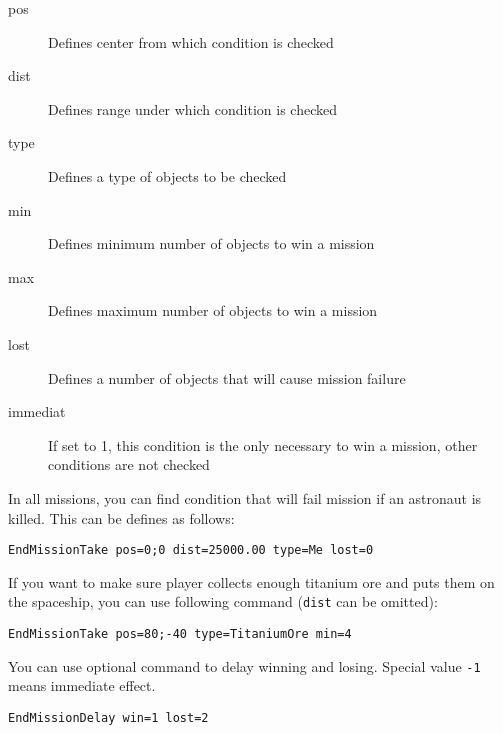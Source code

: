 \begin{description}
    \item[pos] Defines center from which condition is checked
    \item[dist] Defines range under which condition is checked
    \item[type] Defines a type of objects to be checked
    \item[min] Defines minimum number of objects to win a mission
    \item[max] Defines maximum number of objects to win a mission
    \item[lost] Defines a number of objects that will cause mission failure
    \item[immediat] If set to 1, this condition is the only necessary to win a mission, other conditions are not checked
\end{description}

In all missions, you can find condition that will fail mission if an astronaut is killed. This can be defines as follows:

\begin{verbatim}
EndMissionTake pos=0;0 dist=25000.00 type=Me lost=0
\end{verbatim}

If you want to make sure player collects enough titanium ore and puts them on the spaceship, you can use following command (\texttt{dist} can be omitted):

\begin{verbatim}
EndMissionTake pos=80;-40 type=TitaniumOre min=4
\end{verbatim}

You can use optional command to delay winning and losing. Special value \texttt{-1} means immediate effect.

\begin{verbatim}
EndMissionDelay win=1 lost=2
\end{verbatim}
